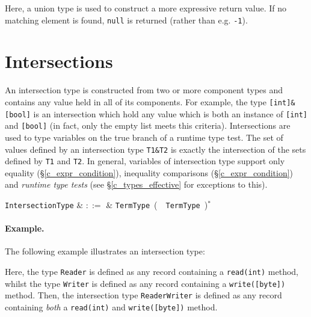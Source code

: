 

Here, a union type is used to construct a more expressive return value.  If no matching element is found, \lstinline{null} is returned (rather than e.g. \lstinline{-1}).


\section{Intersections}
\label{c_types_intersections}

An intersection type is constructed from two or more component types and contains any value held in all of its components.  For example, the type \lstinline{[int]&[bool]} is an intersection which hold any value which is both an instance of \lstinline{[int]} and \lstinline{[bool]} (in fact, only the empty list meets this criteria).  Intersections are used to type variables on the true branch of a runtime type test.  The set of values defined by an intersection type \lstinline{T1&T2} is exactly the intersection of the sets defined by \lstinline{T1} and \lstinline{T2}.  In general, variables of intersection type support only equality (\S\ref{c_expr_condition}), inequality comparisons (\S\ref{c_expr_condition}) and {\em runtime type tests} (see \S\ref{c_types_effective} for exceptions to this).

\begin{syntax}
  \verb+IntersectionType+ & $::=$ & \verb+TermType+\ \big(\ \token{\&}\ \verb+TermType+\
  \big)$^*$\\
\end{syntax}

\paragraph{Example.} The following example illustrates an intersection type:



Here, the type \lstinline{Reader} is defined as any record containing a \lstinline{read(int)} method, whilst the type \lstinline{Writer} is defined as any record containing a \lstinline{write([byte])} method.  Then, the intersection type \lstinline{ReaderWriter} is defined as any record containing {\em both} a \lstinline{read(int)} and \lstinline{write([byte])} method.


